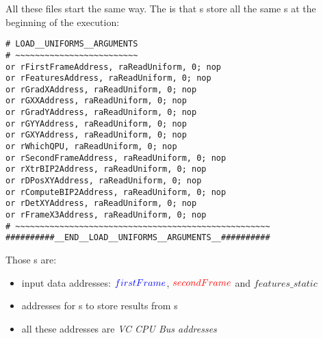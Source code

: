 All these  files start the same way. The  is that \qpu{}s store all the same \uni{}s at the beginning of the execution:

\begin{lstlisting}
# LOAD__UNIFORMS__ARGUMENTS
# ~~~~~~~~~~~~~~~~~~~~~~~~~
or rFirstFrameAddress, raReadUniform, 0; nop
or rFeaturesAddress, raReadUniform, 0; nop
or rGradXAddress, raReadUniform, 0; nop
or rGXXAddress, raReadUniform, 0; nop
or rGradYAddress, raReadUniform, 0; nop
or rGYYAddress, raReadUniform, 0; nop
or rGXYAddress, raReadUniform, 0; nop
or rWhichQPU, raReadUniform, 0; nop
or rSecondFrameAddress, raReadUniform, 0; nop
or rXtrBIP2Address, raReadUniform, 0; nop
or rDPosXYAddress, raReadUniform, 0; nop
or rComputeBIP2Address, raReadUniform, 0; nop
or rDetXYAddress, raReadUniform, 0; nop
or rFrameX3Address, raReadUniform, 0; nop
# ~~~~~~~~~~~~~~~~~~~~~~~~~~~~~~~~~~~~~~~~~~~~~~~~~~~~
##########__END__LOAD__UNIFORMS__ARGUMENTS__##########
\end{lstlisting}

Those \uni{}s are:
\begin{itemize}
	\item input data addresses: $\textcolor{blue}{firstFrame}$, $\textcolor{red}{secondFrame}$ and $features\_static$
	\item addresses for \qpu{}s to store results from s
	\item all these addresses are \emph{VC CPU Bus addresses}
\end{itemize}

